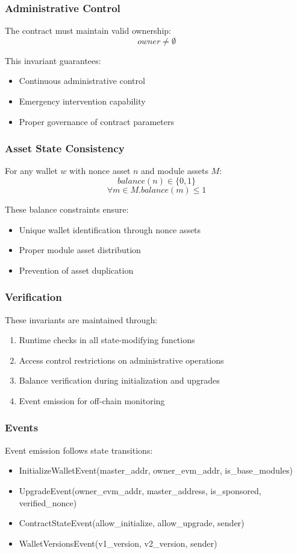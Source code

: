 \subsubsection{Administrative Control}
The contract must maintain valid ownership:
\[ owner \neq \emptyset \]

This invariant guarantees:
\begin{itemize}
   \item Continuous administrative control
   \item Emergency intervention capability
   \item Proper governance of contract parameters
\end{itemize}

\subsubsection{Asset State Consistency}
For any wallet $w$ with nonce asset $n$ and module assets $M$:
\[ balance(n) \in \{0, 1\} \]
\[ \forall m \in M. balance(m) \leq 1 \]

These balance constraints ensure:
\begin{itemize}
   \item Unique wallet identification through nonce assets
   \item Proper module asset distribution
   \item Prevention of asset duplication
\end{itemize}

\subsubsection{Verification}
These invariants are maintained through:
\begin{enumerate}
   \item Runtime checks in all state-modifying functions
   \item Access control restrictions on administrative operations
   \item Balance verification during initialization and upgrades
   \item Event emission for off-chain monitoring
\end{enumerate}

\subsubsection{Events}
Event emission follows state transitions:
\begin{itemize}
    \item InitializeWalletEvent(master\_addr, owner\_evm\_addr, is\_base\_modules)
    \item UpgradeEvent(owner\_evm\_addr, master\_address, is\_sponsored, verified\_nonce)
    \item ContractStateEvent(allow\_initialize, allow\_upgrade, sender)
    \item WalletVersionsEvent(v1\_version, v2\_version, sender)
\end{itemize}

